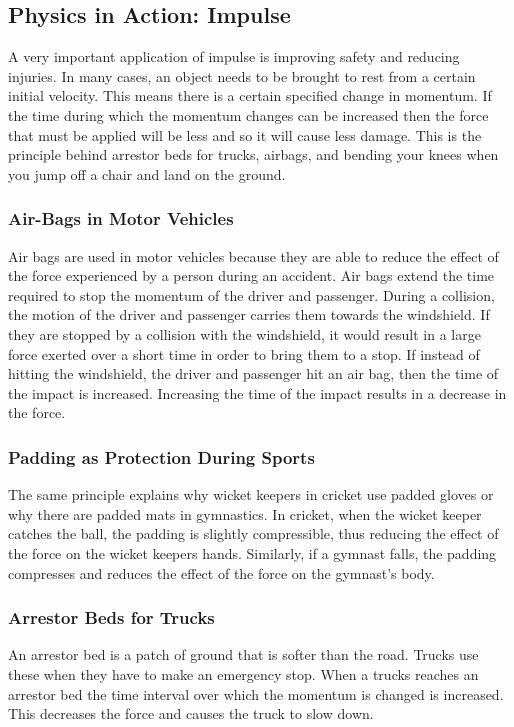 \subsection{Physics in Action: Impulse}
A very important application of impulse is improving safety and reducing injuries. In many cases, an object needs to be brought to rest from a certain initial velocity. This means there is a certain specified change in momentum. If the time during which the momentum changes can be increased then the force that must be applied will be less and so it will cause less damage. This is the principle behind arrestor beds for trucks, airbags, and bending your knees when you jump off a chair and land on the ground.

\subsubsection{Air-Bags in Motor Vehicles}
Air bags are used in motor vehicles because they are able to reduce the effect of the force experienced by a person during an accident. Air bags extend the time required to stop the momentum of the driver and passenger. During a collision, the motion of the driver and passenger carries them towards the windshield. If they are stopped by a collision with the windshield, it would result in a large force exerted over a short time in order to bring them to a stop. If instead of hitting the windshield, the driver and passenger hit an air bag, then the time of the impact is increased. Increasing the time of the impact results in a decrease in the force.

\subsubsection{Padding as Protection During Sports}
The same principle explains why wicket keepers in cricket use padded gloves or why there are padded mats in gymnastics. In cricket, when the wicket keeper catches the ball, the padding is slightly compressible, thus reducing the effect of the force on the wicket keepers hands. Similarly, if a gymnast falls, the padding compresses and reduces the effect of the force on the gymnast's body.

\subsubsection{Arrestor Beds for Trucks}
An arrestor bed is a patch of ground that is softer than the road. Trucks use these when they have to make an emergency stop. When a trucks reaches an arrestor bed the time interval over which the momentum is changed is increased. This decreases the force and causes the truck to slow down.

